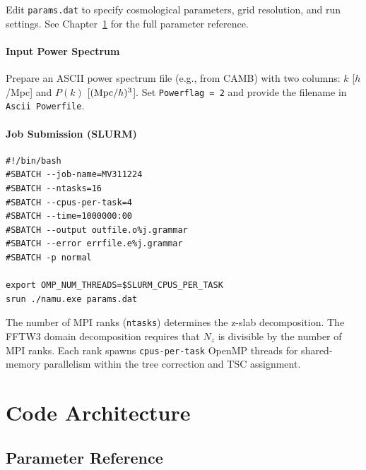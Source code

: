 \documentclass[11pt,fleqn]{book}
\newcommand{\code}[1]{\texttt{#1}}
\newcommand{\file}[1]{\texttt{#1}}
\begin{document}
Edit \file{params.dat} to specify cosmological parameters, grid resolution, and run settings.  See Chapter~\ref{ch:params} for the full parameter reference.

\subsection{Input Power Spectrum}

Prepare an ASCII power spectrum file (e.g., from CAMB) with two columns: $k$ [$h$/Mpc] and $P(k)$ [$({\rm Mpc}/h)^3$].  Set \code{Powerflag = 2} and provide the filename in \code{Ascii Powerfile}.

\subsection{Job Submission (SLURM)}

\begin{codebox}
\begin{lstlisting}[style=bash,numbers=none]
#!/bin/bash
#SBATCH --job-name=MV311224
#SBATCH --ntasks=16
#SBATCH --cpus-per-task=4
#SBATCH --time=1000000:00
#SBATCH --output outfile.o%j.grammar
#SBATCH --error errfile.e%j.grammar
#SBATCH -p normal

export OMP_NUM_THREADS=$SLURM_CPUS_PER_TASK
srun ./namu.exe params.dat
\end{lstlisting}
\end{codebox}

\begin{infobox}
The number of MPI ranks (\code{ntasks}) determines the z-slab decomposition.  The FFTW3 domain decomposition requires that $N_z$ is divisible by the number of MPI ranks.  Each rank spawns \code{cpus-per-task} OpenMP threads for shared-memory parallelism within the tree correction and TSC assignment.
\end{infobox}


\part{Code Architecture}

\chapter{Parameter Reference}
\label{ch:params}
\end{document}
